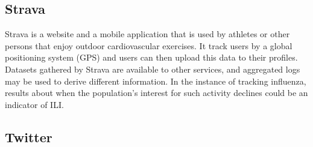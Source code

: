   

\subsection{Strava}
Strava\cite{strava_main} is a website and a mobile application that is used by athletes or other persons that enjoy outdoor cardiovascular exercises. It track users by a global positioning system (GPS) and users can then upload this data to their profiles\cite{strata_wiki}. Datasets gathered by Strava are available to other services, and aggregated logs may be used to derive different information. In the instance of tracking influenza, results about when the population's interest for such activity declines could be an indicator of ILI. 





\subsection{Twitter}
